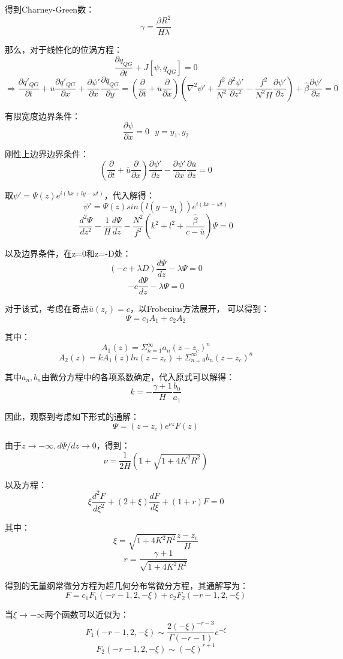 \documentclass{article}
\begin{document}
得到Charney-Green数：
$$\gamma = \frac{\beta R^2}{H\lambda}$$

那么，对于线性化的位涡方程：
$$\frac{\partial q_{QG}}{\partial t}+J[\psi,q_{QG}] = 0$$
$$\Rightarrow \frac{\partial q'_{QG}}{\partial t}
+\overline{u}\frac{\partial q'_{QG}}{\partial x}
+\frac{\partial \psi'}{\partial x}
\frac{\partial \overline{q}_{QG}}{\partial y} = 
(\frac{\partial}{\partial t}
+\overline{u}\frac{\partial }{\partial x})(\nabla^2\psi' + 
\frac{f^2}{N^2}\frac{\partial^2 \psi'}{\partial z^2}
- \frac{f^2}{N^2H}\frac{\partial \psi'}{\partial z}) 
+ \hat{\beta}\frac{\partial \psi'}{\partial x}=0$$

有限宽度边界条件：
$$\frac{\partial \psi}{\partial x} = 0 \ \ \ y = y_1, y_2$$

刚性上边界边界条件：
$$(\frac{\partial }{\partial t}
+\overline{u}\frac{\partial}{\partial x})
\frac{\partial \psi'}{\partial z}
- \frac{\partial \psi'}{\partial x}\frac{\partial \overline{u}}{\partial z}
=0$$

取$\psi' = \Psi(z)e^{i(kx+ly-\omega t)}$，代入解得：
$$\psi' = \Psi(z)sin(l(y-y_1))e^{i(kx-\omega t)}$$
$$\frac{d^2\Psi}{dz^2} - \frac{1}{H}\frac{d\Psi}{dz} 
- \frac{N^2}{f^2}(k^2+l^2+\frac{\hat{\beta}}{c-\overline{u}})\Psi = 0$$

以及边界条件，在z=0和z=-D处：
$$(-c+\lambda D)\frac{d\Psi}{dz} - \lambda\Psi = 0$$
$$-c\frac{d\Psi}{dz} - \lambda\Psi = 0$$

对于该式，考虑在奇点$\overline{u}(z_c) = c$，以Frobenius方法展开，
可以得到：
$$\Psi = c_1A_1 + c_2A_2$$

其中：
$$A_1(z) = \Sigma_{n=1}^{\infty}a_n(z-z_c)^n$$
$$A_2(z) = kA_1(z)ln(z-z_c)
+\Sigma_{n=0}^{\infty}b_n(z-z_c)^n$$

其中$a_n,b_n$由微分方程中的各项系数确定，代入原式可以解得：
$$k = -\frac{\gamma + 1}{H}\frac{b_0}{a_1}$$

因此，观察到考虑如下形式的通解：
$$\Psi = (z-z_c)e^{\nu z}F(z)$$

由于$z\rightarrow -\infty, d\Psi/dz\rightarrow 0$，得到：
$$\nu = \frac{1}{2H}\left(1+\sqrt{1+4K^2R^2}\right)$$

以及方程：
$$\xi\frac{d^2F}{d\xi^2} + (2+\xi)\frac{dF}{d\xi} + (1+r)F = 0$$

其中：
$$\xi = \sqrt{1+4K^2R^2}\frac{z-z_c}{H}$$
$$r = \frac{\gamma+1}{\sqrt{1+4K^2R^2}}$$

得到的无量纲常微分方程为超几何分布常微分方程，其通解写为：
$$F = c_1F_1(-r-1, 2, -\xi) + c_2F_2(-r-1, 2, -\xi)$$

当$\xi\rightarrow-\infty$两个函数可以近似为：
$$F_1(-r-1, 2, -\xi) \sim \frac{2(-\xi)^{-r-3}}{\Gamma(-r-1)}e^{-\xi}$$
$$F_2(-r-1, 2, -\xi) \sim (-\xi)^{r+1}$$
\end{document}
